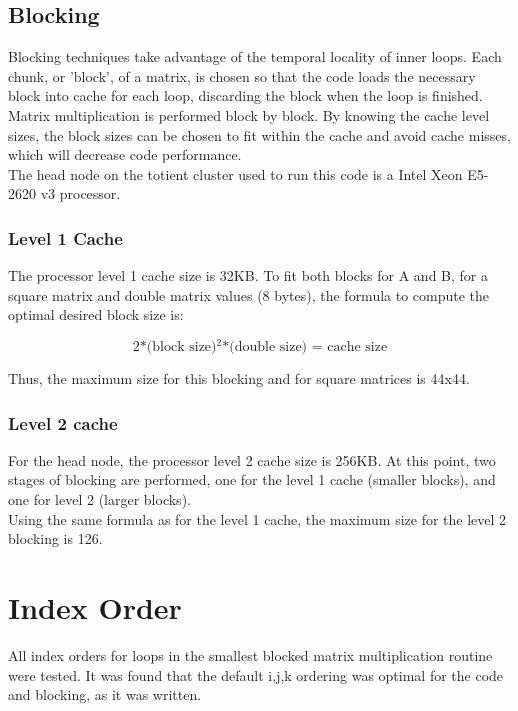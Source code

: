 \documentclass{article}	 %
\begin{document}
\subsection{Blocking}
Blocking techniques take advantage of the temporal locality of inner loops. Each chunk, or 'block', of a matrix, is chosen so that the code loads the necessary block into cache for each loop, discarding the block when the loop is finished. Matrix multiplication is performed block by block. By knowing the cache level sizes, the block sizes can be chosen to fit within the cache and avoid cache misses, which will decrease code performance. \\ 

\noindent The head node on the totient cluster used to run this code is a Intel Xeon E5-2620 v3 processor. 

\subsubsection{Level 1 Cache}
The processor level 1 cache size is 32KB. To fit both blocks for A and B, for a square matrix and double matrix values (8 bytes), the formula to compute the optimal desired block size is:

\begin{equation}
\text{2*(block size)$^2$*(double size) = cache size}
\end{equation}

\noindent Thus, the maximum size for this blocking and for square matrices is 44x44.

\subsubsection{Level 2 cache}
For the head node, the processor level 2 cache size is 256KB. At this point, two stages of blocking are performed, one for the level 1 cache (smaller blocks), and one for level 2 (larger blocks). \\

\noindent Using the same formula as for the level 1 cache, the maximum size for the level 2 blocking is 126.

\section{Index Order}
All index orders for loops in the smallest blocked matrix multiplication routine were tested. It was found that the default i,j,k ordering was optimal for the code and blocking, as it was written.
\end{document}
